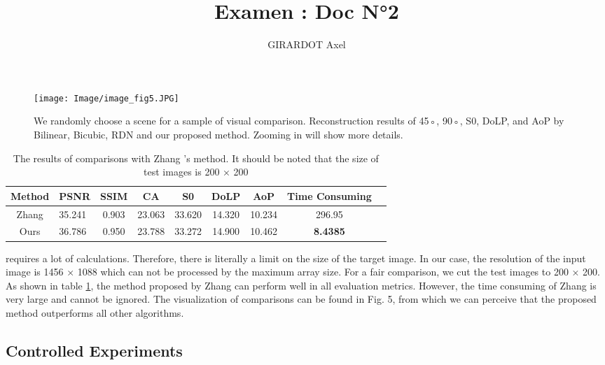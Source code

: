 \documentclass[10pt,twocolumn,letterpaper]{article}
\begin{document}
\nocite{*}

\title{Examen : Doc N°2}
\author{GIRARDOT Axel}
\maketitle


\begin{figure*}
    \centering
    \texttt{[image: Image/image\_fig5.JPG]}
    \caption{We randomly choose a scene for a sample of visual comparison. Reconstruction results of 45◦, 90◦, S0, DoLP, and AoP by Bilinear, Bicubic, RDN and our proposed method. Zooming in will show more details.}
    \label{fig:5}
\end{figure*}


\begin{table}[H]
    \centering
    \begin{tabular}{c|lccccccc}
        \hline \hline
        \hline
        Method & PSNR  & SSIM & CA & S0 & DoLP & AoP & Time Consuming \\
        \hline
        {Zhang \cite{50_opticsletters}} & 35.241 & 0.903 & 23.063 & 33.620 & 14.320 & 10.234 & 296.95\\
        {Ours}& 36.786 & 0.950 & 23.788 & 33.272 & 14.900 & 10.462 & \textbf{8.4385}\\
        \hline
        \hline \hline
    \end{tabular}
    \caption{The results of comparisons with Zhang \cite{50_opticsletters}’s method. It should be noted that the size of test images is 200 × 200}
    \label{tab:table2}
\end{table}

\noindent requires a lot of calculations. Therefore, there is literally a limit on the size of the target image. In our case, the resolution of the input image is 1456 × 1088 which can not be processed by the maximum array size. For a fair comparison, we cut the test images to 200 × 200. As shown in table \ref{tab:table2}, the method proposed by Zhang \cite{50_opticsletters} can perform well in all evaluation metrics. However, the time consuming of Zhang \cite{50_opticsletters} is very large and cannot be ignored. The visualization of comparisons can be found in Fig. 5, from which we can perceive that the proposed method outperforms all other algorithms.

\subsection{Controlled Experiments}
\end{document}
